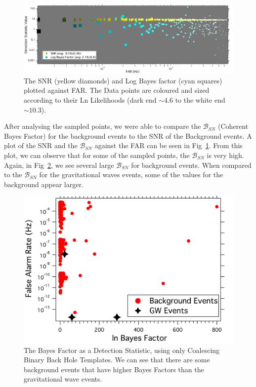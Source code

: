 \documentclass{article}
\begin{document}
          \begin{figure}[h]
          	\centering
          	\includegraphics[width=1\textwidth]{Figures/DetectionStatVSfar_bF.pdf} 
          	\caption{The SNR (yellow diamonds) and Log Bayes factor (cyan squares) plotted against FAR. The Data points are coloured and sized according to their Ln Likelihoods (dark end $\sim4.6 $ to the white end $\sim10.3$).}
          	\label{Fig:BayesVSFAR}
          \end{figure}
         
   
 
 After analysing the sampled points, we were able to compare the $\mathcal{B}_{SN}$ (Coherent Bayes Factor) for the background events to the SNR of the Background events. A plot of the SNR and the $\mathcal{B}_{SN}$ against the FAR can be seen in Fig~\ref{Fig:BayesVSFAR}. From this plot, we can observe that for some of the sampled points, the $\mathcal{B}_{SN}$ is very high. Again, in Fig~\ref{Fig:FARvsBayesFactor}, we see several large $\mathcal{B}_{SN}$ for background events. When compared to the $\mathcal{B}_{SN}$ for the gravitational waves events, some of the values for the background appear larger. \\
 
 
  
  \begin{figure}[h]
  	\centering
  	\includegraphics[width=1\textwidth]{Figures/FARvsBayesFactor.png} 
  	\caption{The Bayes Factor as a Detection Statistic, using only Coalescing Binary Back Hole Templates. We can see that there are some background events that have higher Bayes Factors than the gravitational wave events.} 
  	\label{Fig:FARvsBayesFactor}
  \end{figure}
  
\end{document}
